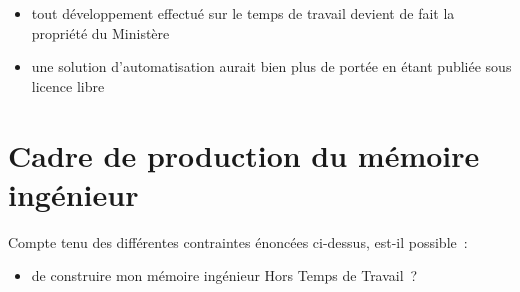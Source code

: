 \documentclass[10pt]{article}
\newenvironment{itmz}{\begin{itemize}
\setlength{\itemsep}{0em}
}{\end{itemize}}
\begin{document}
\begin{itmz}
\item{tout développement effectué sur le temps de travail devient de fait la propriété du Ministère}
\item{une solution d’automatisation aurait bien plus de portée en étant publiée sous licence libre}
\end{itmz}

\section{Cadre de production du mémoire ingénieur}

Compte tenu des différentes contraintes énoncées ci-dessus, est-il possible :
\begin{itmz}
\item{de construire mon mémoire ingénieur Hors Temps de Travail ?}
\end{itmz}
\end{document}
